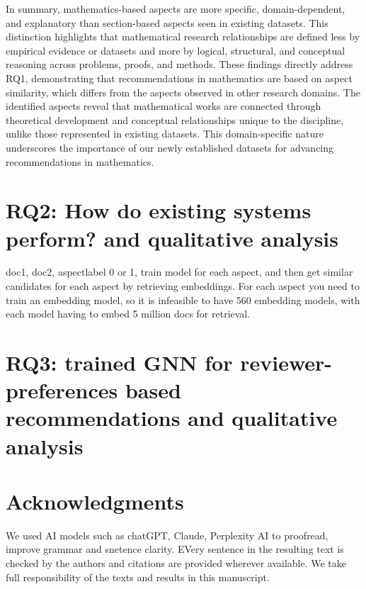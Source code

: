 \documentclass[sigconf,anonymous]{acmart}
\begin{document}
In summary, mathematics-based aspects are more specific, domain-dependent, and explanatory than section-based aspects seen in existing datasets.
This distinction highlights that mathematical research relationships are defined less by empirical evidence or datasets and more by logical, structural, and conceptual reasoning across problems, proofs, and methods.
These findings directly address RQ1, demonstrating that recommendations in mathematics are based on aspect similarity, which differs from the aspects observed in other research domains.
The identified aspects reveal that mathematical works are connected through theoretical development and conceptual relationships unique to the discipline, unlike those represented in existing datasets.
This domain-specific nature underscores the importance of our newly established datasets for advancing recommendations in mathematics.

\section{RQ2: How do existing systems perform? and qualitative analysis}

doc1, doc2, aspectlabel 0 or 1, train model for each aspect, and then get similar candidates for each aspect by retrieving embeddings.
For each aspect you need to train an embedding model, so it is infeasible to have 560 embedding models, with each model having to embed 5 million docs for retrieval. 

\section{RQ3: trained GNN for reviewer-preferences based recommendations and qualitative analysis}

\section{Acknowledgments}

We used AI models such as chatGPT, Claude, Perplexity AI to proofread, improve grammar and snetence clarity. EVery sentence in the resulting text is checked by the authors and citations are provided wherever available. We take full responsibility of the texts and results in this manuscript.




\appendix
\end{document}
